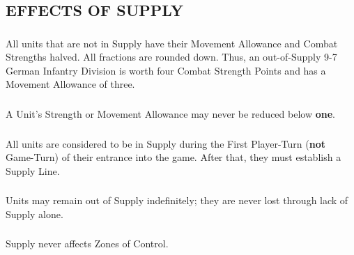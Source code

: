\subsection{EFFECTS OF SUPPLY}

\subsubsection{} All units that are not in Supply have their Movement Allowance and Combat Strengths halved. All fractions are rounded down. Thus, an out-of-Supply 9-7 German Infantry Division is worth four Combat Strength Points and has a Movement Allowance of three.

\subsubsection{} A Unit's Strength or Movement Allowance may never be reduced below \textbf{one}.

\subsubsection{} All units are considered to be in Supply during the First Player-Turn (\textbf{not} Game-Turn) of their entrance into the game. After that, they must establish a Supply Line.

\subsubsection{} Units may remain out of Supply indefinitely; they are never lost through lack of Supply alone.

\subsubsection{} Supply never affects Zones of Control.
